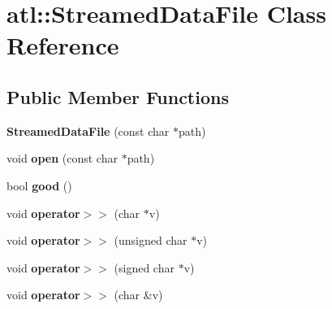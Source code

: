 \hypertarget{classatl_1_1_streamed_data_file}{\section{atl\+:\+:Streamed\+Data\+File Class Reference}
\label{classatl_1_1_streamed_data_file}
}
\subsection*{Public Member Functions}
\begin{DoxyCompactItemize}
\item 
\hypertarget{classatl_1_1_streamed_data_file_a6e67c20c6c9cadc73c8b1f03aa718d02}{{\bfseries Streamed\+Data\+File} (const char $\ast$path)}\label{classatl_1_1_streamed_data_file_a6e67c20c6c9cadc73c8b1f03aa718d02}

\item 
\hypertarget{classatl_1_1_streamed_data_file_a3b2671f133e8a530d98ac590580c6096}{void {\bfseries open} (const char $\ast$path)}\label{classatl_1_1_streamed_data_file_a3b2671f133e8a530d98ac590580c6096}

\item 
\hypertarget{classatl_1_1_streamed_data_file_a527cb3ee0f344dc0c4ac97294e191abc}{bool {\bfseries good} ()}\label{classatl_1_1_streamed_data_file_a527cb3ee0f344dc0c4ac97294e191abc}

\item 
\hypertarget{classatl_1_1_streamed_data_file_a22b5623bf585d73489dad501eab354a2}{void {\bfseries operator$>$$>$} (char $\ast$v)}\label{classatl_1_1_streamed_data_file_a22b5623bf585d73489dad501eab354a2}

\item 
\hypertarget{classatl_1_1_streamed_data_file_ad26d2083f90178d75dc92f81bb57c441}{void {\bfseries operator$>$$>$} (unsigned char $\ast$v)}\label{classatl_1_1_streamed_data_file_ad26d2083f90178d75dc92f81bb57c441}

\item 
\hypertarget{classatl_1_1_streamed_data_file_aa4ffdabdad2333b34b72ea0e60008b79}{void {\bfseries operator$>$$>$} (signed char $\ast$v)}\label{classatl_1_1_streamed_data_file_aa4ffdabdad2333b34b72ea0e60008b79}

\item 
\hypertarget{classatl_1_1_streamed_data_file_a35195c6a64047382340b12bc0b00df0b}{void {\bfseries operator$>$$>$} (char \&v)}\label{classatl_1_1_streamed_data_file_a35195c6a64047382340b12bc0b00df0b}


\end{DoxyCompactItemize}
